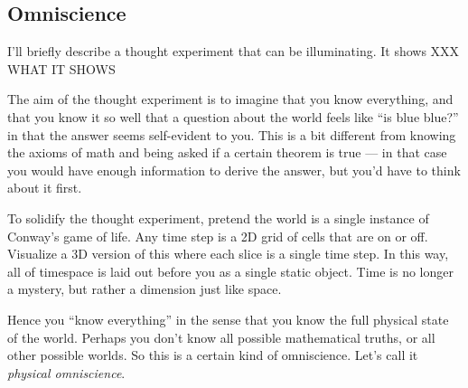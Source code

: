 \documentclass[11pt, oneside]{article}   	%
\begin{document}
%

\subsection{Omniscience}

I'll briefly describe a thought experiment that can be illuminating.
It shows XXX WHAT IT SHOWS

The aim of the thought experiment is to imagine that you know everything,
and that you know it so well that a question about the world feels like ``is
blue blue?'' in that the answer seems self-evident to you. This is a bit
different from knowing the axioms of math and being asked if a certain theorem
is true --- in that case you would have enough information to derive the answer,
but you'd have to think about it first.

To solidify the thought experiment, pretend the world is a single instance of
Conway's game of life. Any time step is a 2D grid of cells that are on or off.
Visualize a 3D version of this where each slice is a single time step. In this
way, all of timespace is laid out before you as a single static object. Time is
no longer a mystery, but rather a dimension just like space.

Hence you ``know everything'' in the sense that you know the full physical state
of the world. Perhaps you don't know all possible mathematical truths, or all
other possible worlds. So this is a certain kind of omniscience. Let's call it
{\em physical omniscience}.
\end{document}
